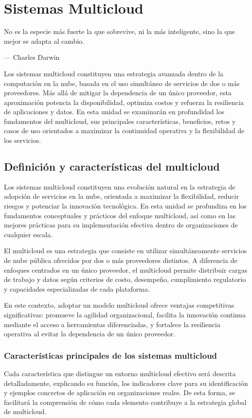 {\justifying
	\chapter{Sistemas Multicloud}
	\epigraph{No es la especie más fuerte la que sobrevive, ni la más inteligente, sino la que mejor se adapta al cambio.}
    {--- \textup{Charles Darwin}}

    Los sistemas multicloud constituyen una estrategia avanzada dentro de la computación en la nube, basada en el uso simultáneo de servicios de dos o más proveedores. Más allá de mitigar la dependencia de un único proveedor, esta aproximación potencia la disponibilidad, optimiza costos y refuerza la resiliencia de aplicaciones y datos. En esta unidad se examinarán en profundidad los fundamentos del multicloud, sus principales características, beneficios, retos y casos de uso orientados a maximizar la continuidad operativa y la flexibilidad de los servicios.

    \section{Definición y características del multicloud}
        Los sistemas multicloud constituyen una evolución natural en la estrategia de adopción de servicios en la nube, orientada a maximizar la flexibilidad, reducir riesgos y potenciar la innovación tecnológica. En esta unidad se profundiza en los fundamentos conceptuales y prácticos del enfoque multicloud, así como en las mejores prácticas para su implementación efectiva dentro de organizaciones de cualquier escala.
        
        El multicloud es una estrategia que consiste en utilizar simultáneamente servicios de nube pública ofrecidos por dos o más proveedores distintos. A diferencia de enfoques centrados en un único proveedor, el multicloud permite distribuir cargas de trabajo y datos según criterios de costo, desempeño, cumplimiento regulatorio y capacidades especializadas de cada plataforma.
        
        En este contexto, adoptar un modelo multicloud ofrece ventajas competitivas significativas: promueve la agilidad organizacional, facilita la innovación continua mediante el acceso a herramientas diferenciadas, y fortalece la resiliencia operativa al evitar la dependencia de un único proveedor.
        
        \subsection{Características principales de los sistemas multicloud}
            Cada característica que distingue un entorno multicloud efectivo será descrita detalladamente, explicando su función, los indicadores clave para su identificación y ejemplos concretos de aplicación en organizaciones reales. De esta forma, se facilitará la comprensión de cómo cada elemento contribuye a la estrategia global de multicloud.
            
}
